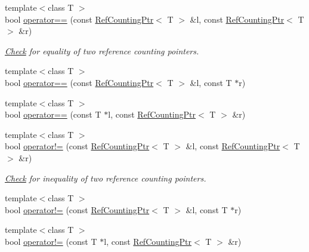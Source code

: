 \begin{DoxyCompactItemize}
\item 
{\footnotesize template$<$class T $>$ }\\bool \hyperlink{refcnt_8hh_a80f756a089fa7f637c365317498d9126}{operator==} (const \hyperlink{classRefCountingPtr}{RefCountingPtr}$<$ T $>$ \&l, const \hyperlink{classRefCountingPtr}{RefCountingPtr}$<$ T $>$ \&r)
\begin{DoxyCompactList}\small\item\em \hyperlink{classCheck}{Check} for equality of two reference counting pointers. \item\end{DoxyCompactList}\item 
{\footnotesize template$<$class T $>$ }\\bool \hyperlink{refcnt_8hh_a3d72905499b41a69da9fbeca4d406508}{operator==} (const \hyperlink{classRefCountingPtr}{RefCountingPtr}$<$ T $>$ \&l, const T $\ast$r)
\item 
{\footnotesize template$<$class T $>$ }\\bool \hyperlink{refcnt_8hh_a2060a16b61b6e20f45bdaf8ad44ae29d}{operator==} (const T $\ast$l, const \hyperlink{classRefCountingPtr}{RefCountingPtr}$<$ T $>$ \&r)
\item 
{\footnotesize template$<$class T $>$ }\\bool \hyperlink{refcnt_8hh_a096e1231a0265dde049419eeb46b8055}{operator!=} (const \hyperlink{classRefCountingPtr}{RefCountingPtr}$<$ T $>$ \&l, const \hyperlink{classRefCountingPtr}{RefCountingPtr}$<$ T $>$ \&r)
\begin{DoxyCompactList}\small\item\em \hyperlink{classCheck}{Check} for inequality of two reference counting pointers. \item\end{DoxyCompactList}\item 
{\footnotesize template$<$class T $>$ }\\bool \hyperlink{refcnt_8hh_a9d52e3c3b48f1f3a45c3774943b7368f}{operator!=} (const \hyperlink{classRefCountingPtr}{RefCountingPtr}$<$ T $>$ \&l, const T $\ast$r)
\item 
{\footnotesize template$<$class T $>$ }\\bool \hyperlink{refcnt_8hh_a9bec8412054511ee771c632a0e62db6d}{operator!=} (const T $\ast$l, const \hyperlink{classRefCountingPtr}{RefCountingPtr}$<$ T $>$ \&r)
\end{DoxyCompactItemize}


